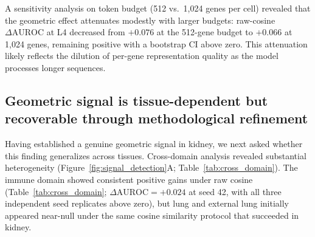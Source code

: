 \documentclass[11pt]{article}
\newcommand{\DAURC}{\Delta\mathrm{AUROC}}
\begin{document}
A sensitivity analysis on token budget (512 vs.\ 1,024 genes per cell) revealed that the geometric effect attenuates modestly with larger budgets: raw-cosine $\DAURC$ at L4 decreased from $+0.076$ at the 512-gene budget to $+0.066$ at 1,024 genes, remaining positive with a bootstrap CI above zero.
This attenuation likely reflects the dilution of per-gene representation quality as the model processes longer sequences.

\subsection*{Geometric signal is tissue-dependent but recoverable through methodological refinement}

Having established a genuine geometric signal in kidney, we next asked whether this finding generalizes across tissues.
Cross-domain analysis revealed substantial heterogeneity (Figure~\ref{fig:signal_detection}A; Table~\ref{tab:cross_domain}).
The immune domain showed consistent positive gains under raw cosine (Table~\ref{tab:cross_domain}; $\DAURC = +0.024$ at seed 42, with all three independent seed replicates above zero), but lung and external lung initially appeared near-null under the same cosine similarity protocol that succeeded in kidney.
\end{document}
